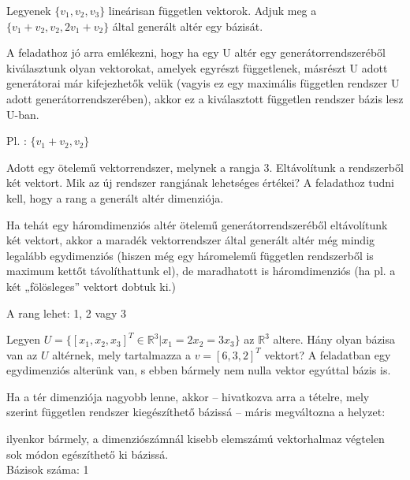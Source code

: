 \begin{frame}
  \begin{tcolorbox}[title={3/9. {\symknight}}]
     Legyenek $\{v_1,v_2,v_3\}$ lineárisan független vektorok. Adjuk meg a $\{v_1 + v_2,v_2,2v_1 + v_2\}$ által generált altér egy bázisát.

  \tcblower
A feladathoz jó arra emlékezni, hogy ha egy U altér egy generátorrendszeréből kiválasztunk olyan vektorokat, amelyek egyrészt függetlenek, másrészt U adott generátorai már kifejezhetők velük (vagyis ez egy maximális független rendszer U adott generátorrendszerében), akkor ez a kiválasztott független rendszer bázis lesz U-ban.\\
    \mmedskip 
  
     Pl. : $\{v_1 + v_2,v_2\}$
  \end{tcolorbox}
\end{frame}


\begin{frame}
  \begin{tcolorbox}[title={3/10. {\symqueen}}]
     Adott egy ötelemű vektorrendszer, melynek a rangja $3.$ Eltávolítunk a rendszerből két vektort. Mik az új rendszer rangjának lehetséges értékei?
  \tcblower
    A feladathoz tudni kell, hogy a rang a generált altér dimenziója.\\
    \mmedskip
    
    Ha tehát egy háromdimenziós altér ötelemű generátorrendszeréből eltávolítunk két vektort, akkor a maradék vektorrendszer által generált altér még mindig legalább egydimenziós (hiszen még egy háromelemű független rendszerből is maximum kettőt távolíthattunk el), de maradhatott is háromdimenziós (ha pl. a két „fölösleges” vektort dobtuk ki.)\\
    \mmedskip 
  
     A rang lehet: 1, 2 vagy 3
  \end{tcolorbox}
\end{frame}


\begin{frame}
  \begin{tcolorbox}[title={3/11. {\symqueen}}]
     Legyen $U = \{[x_1,x_2,x_3]^T \in \mathbb{R}^3|x_1 = 2x_2 = 3x_3\}$ az $\mathbb{R}^3$ altere. Hány olyan bázisa van az $U$ altérnek, mely tartalmazza a $v = [6,3,2]^T$ vektort?
  \tcblower  
    A feladatban egy egydimenziós alterünk van, s ebben bármely nem nulla vektor egyúttal bázis is.\\
    \mmedskip
    
    Ha a tér dimenziója nagyobb lenne, akkor – hivatkozva arra a tételre, mely szerint független rendszer kiegészíthető bázissá – máris megváltozna a helyzet:\\
    \mmedskip
    
    ilyenkor bármely, a dimenziószámnál kisebb elemszámú vektorhalmaz végtelen sok módon egészíthető ki bázissá.\\
    \mmedskip 
    Bázisok száma: 1
  \end{tcolorbox}
\end{frame}



